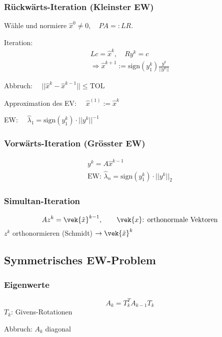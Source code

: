 		\subsubsection{Rückwärts-Iteration (Kleinster EW)}
			\begin{tightenumerate}
				\item Wähle und normiere $\hat x^{0}\neq 0, \quad PA=:LR$.
				\item Iteration:
				\begin{gather*}
					Lc=\hat x^{k}, \quad Ry^{k}=c \\
					\Rightarrow \hat x^{k+1}:=\text{sign}(y_1^{k})\frac{y^{k}}{||y^{k}||}
				\end{gather*}
				\item Abbruch: $\quad ||\hat x^{k}-\hat x^{k-1}||\leq \mathrm{TOL}$
				\item Approximation des EV: $\quad \hat x^{(1)}:=\hat x^k$
				\item EW: $\quad \hat \lambda_1 = \text{sign}(y_1^k)\cdot ||y^k||^{-1}$
			\end{tightenumerate}

		\subsubsection{Vorwärts-Iteration (Grösster EW)}
			\begin{gather*}
				y^k = A \hat x^{k-1} \\
				\text{EW: } \hat \lambda_n = \text{sign}(y_1^k) \cdot || y^k||_2
			\end{gather*}

		\subsubsection{Simultan-Iteration}
			\[
				Az^k = \vek{\tilde x}^{k-1}, \qquad \vek{x} \text{: orthonormale Vektoren}
			\]
			$z^k$ orthonormieren (Schmidt) $\rightarrow \vek{\tilde x}^k$

	\subsection{Symmetrisches EW-Problem}
		\subsubsection{Eigenwerte}
			\[
				A_k = T_k^T A_{k-1}T_k
			\]
			$T_k$: Givens-Rotationen

			Abbruch: $A_k$ diagonal

